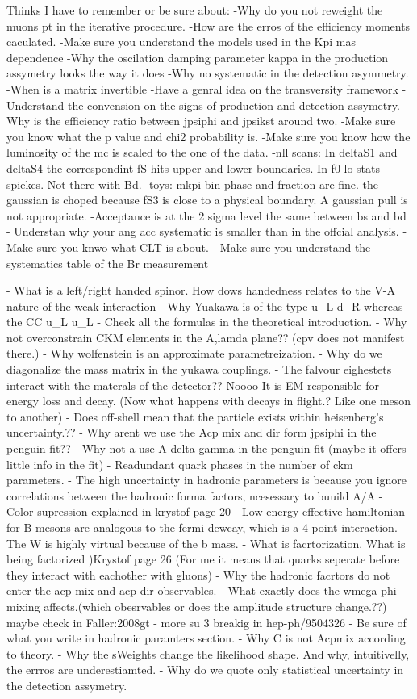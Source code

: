 
Thinks I have to remember or be sure about:
-Why do you not reweight the muons pt in the iterative procedure.
-How are the erros of the efficiency moments caculated.
-Make sure you understand the models used in the Kpi mas dependence
-Why the oscilation damping parameter kappa in the production assymetry looks the way it does
-Why no systematic in the detection asymmetry.
-When is a matrix invertible
-Have a genral idea on the transversity framework
-Understand the convension on the signs of production and detection assymetry.
-Why is the efficiency ratio between jpsiphi and jpsikst around two.
-Make sure you know what the p value and chi2 probability is.
-Make sure you know how the luminosity of the mc is scaled to the one of the data.
-nll scans:
    In deltaS1 and deltaS4 the correspondint fS hits upper and lower boundaries.
    In f0 lo stats spiekes. Not there with Bd.
-toys:
    mkpi bin phase and fraction are fine. the gaussian is choped because fS3 is close to a physical boundary. A gaussian pull is not appropriate.
-Acceptance is at the 2 sigma level the same between bs and bd
- Understan why your ang acc systematic is smaller than in the offcial analysis.
- Make sure you knwo what CLT is about.
- Make sure you understand the systematics table of the Br measurement

- What is a left/right handed spinor. How dows handedness relates to the V-A nature of the weak interaction
- Why Yuakawa is of the type u_L d_R whereas the CC u_L u_L
- Check all the formulas in the theoretical introduction.
- Why not overconstrain CKM elements in the A,lamda plane?? (cpv does not manifest there.)
- Why wolfenstein is an approximate parametreization.
- Why do we diagonalize the mass matrix in the yukawa couplings.
- The falvour eighestets interact with the materals of the detector?? Noooo
  It is EM responsible for energy loss and decay. (Now what happens with decays in flight.? Like one meson to another)
- Does off-shell mean that the particle exists within heisenberg's uncertainty.??
- Why arent we use the Acp mix and dir form jpsiphi in the penguin fit??
- Why not a use A delta gamma in the penguin fit (maybe it offers little info in the fit)
- Readundant quark phases in the number of ckm parameters.
- The high uncertainty in hadronic parameters is because you ignore correlations between the hadronic forma factors, ncesessary to buuild A/A
- Color supression  explained in krystof page 20
- Low energy effective hamiltonian for B mesons are analogous to the fermi dewcay, which is a 4 point interaction. The W is highly virtual because of the b mass.
- What is facrtorization. What is being factorized )Krystof page 26 (For me it means that quarks seperate before they interact with eachother with gluons)
- Why the hadronic facrtors do not enter the acp mix and acp dir observables.
- What exactly does the wmega-phi mixing affects.(which obesrvables or does the amplitude structure change.??)  maybe check in  {Faller:2008gt}
- more su 3 breakig in hep-ph/9504326
- Be sure of what you write in hadronic paramters section.
- Why C is not Acpmix according to theory.
- Why the sWeights change the likelihood shape. And why, intuitivelly, the errros are underestiamted.
- Why do we quote only statistical uncertainty in the detection assymetry.

